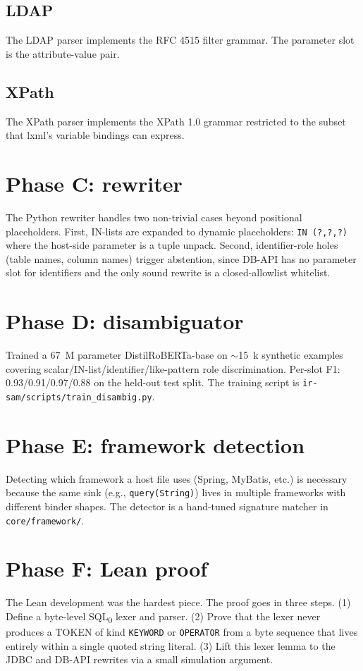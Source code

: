 \documentclass[a4paper,11pt]{report}
\begin{document}
\subsection{LDAP}
The LDAP parser implements the RFC 4515 filter grammar. The parameter slot is the attribute-value pair.

\subsection{XPath}
The XPath parser implements the XPath 1.0 grammar restricted to the subset that lxml's variable bindings can express.

\section{Phase C: rewriter}
The Python rewriter handles two non-trivial cases beyond positional placeholders. First, IN-lists are expanded to dynamic placeholders: \texttt{IN (?,?,?)} where the host-side parameter is a tuple unpack. Second, identifier-role holes (table names, column names) trigger abstention, since DB-API has no parameter slot for identifiers and the only sound rewrite is a closed-allowlist whitelist.

\section{Phase D: disambiguator}
Trained a 67~M parameter DistilRoBERTa-base on $\sim$15~k synthetic examples covering scalar/IN-list/identifier/like-pattern role discrimination. Per-slot F1: 0.93/0.91/0.97/0.88 on the held-out test split. The training script is \texttt{ir-sam/scripts/train\_disambig.py}.

\section{Phase E: framework detection}
Detecting which framework a host file uses (Spring, MyBatis, etc.) is necessary because the same sink (e.g., \texttt{query(String)}) lives in multiple frameworks with different binder shapes. The detector is a hand-tuned signature matcher in \texttt{core/framework/}.

\section{Phase F: Lean proof}
The Lean development was the hardest piece. The proof goes in three steps. (1) Define a byte-level SQL\textsubscript{0} lexer and parser. (2) Prove that the lexer never produces a TOKEN of kind \texttt{KEYWORD} or \texttt{OPERATOR} from a byte sequence that lives entirely within a single quoted string literal. (3) Lift this lexer lemma to the JDBC and DB-API rewrites via a small simulation argument.
\end{document}
